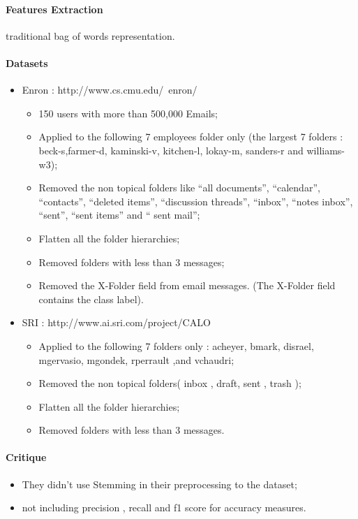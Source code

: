 \documentclass[12pt]{article}
\begin{document}
\paragraph{Features Extraction}
traditional bag of words representation.

\paragraph{Datasets}
    \begin{itemize}
    \item Enron : http://www.cs.cmu.edu/~enron/
    \begin{itemize}
        \item 150 users with more than 500,000 Emails;
        \item Applied to the following 7 employees folder only (the largest 7 folders : beck-s,farmer-d, kaminski-v, kitchen-l, lokay-m, sanders-r and williams-w3);
        \item Removed the non topical folders like “all documents”, “calendar”, “contacts”, “deleted items”, “discussion threads”, “inbox”, “notes inbox”, “sent”, “sent items” and “ sent mail”;
        \item Flatten all the folder hierarchies;
        \item Removed folders with less than 3 messages;
        \item Removed the X-Folder field from email messages. (The X-Folder field contains the class label).
    \end{itemize}
    \item SRI : http://www.ai.sri.com/project/CALO
    \begin{itemize}
        \item Applied to the following 7 folders only : acheyer, bmark, disrael, mgervasio, mgondek, rperrault ,and vchaudri;
        \item Removed the non topical folders( inbox , draft, sent , trash );
        \item Flatten all the folder hierarchies;
        \item Removed folders with less than 3 messages.
    \end{itemize}
\end{itemize}

\paragraph{Critique}
\begin{itemize}
    \item They didn’t use Stemming in their preprocessing to the dataset;
    \item not including precision , recall and f1 score for accuracy measures.
\end{itemize}
\end{document}
